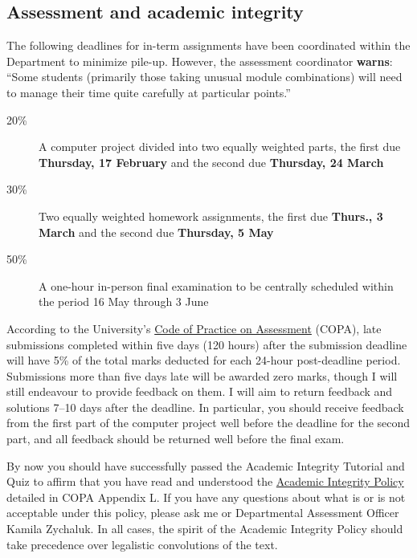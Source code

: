 \subsection*{Assessment and academic integrity}
The following deadlines for in-term assignments have been coordinated within the Department to minimize pile-up.
However, the assessment coordinator \textbf{warns}: ``Some students (primarily those taking unusual module combinations) will need to manage their time quite carefully at particular points.''
\begin{description}
  \item[20\%] A computer project divided into two equally weighted parts, the first due \textbf{Thursday, 17 February} and the second due \textbf{Thursday, 24 March}
  \item[30\%] Two equally weighted homework assignments, the first due \textbf{Thurs., 3 March} and the second due \textbf{Thursday, 5 May}
  \item[50\%] A one-hour in-person final examination to be centrally scheduled within the period 16 May through 3 June
\end{description}

According to the University's \href{https://www.liverpool.ac.uk/media/livacuk/tqsd/code-of-practice-on-assessment/code_of_practice_on_assessment.pdf}{Code of Practice on Assessment} (COPA), late submissions completed within five days (120 hours) after the submission deadline will have 5\% of the total marks deducted for each 24-hour post-deadline period.
Submissions more than five days late will be awarded zero marks, though I will still endeavour to provide feedback on them.
I will aim to return feedback and solutions 7--10 days after the deadline.
In particular, you should receive feedback from the first part of the computer project well before the deadline for the second part, and all feedback should be returned well before the final exam.

By now you should have successfully passed the Academic Integrity Tutorial and Quiz to affirm that you have read and understood the \href{https://www.liverpool.ac.uk/media/livacuk/tqsd/code-of-practice-on-assessment/appendix_L_cop_assess.pdf}{Academic Integrity Policy} detailed in COPA Appendix L.
If you have any questions about what is or is not acceptable under this policy, please ask me or Departmental Assessment Officer Kamila Zychaluk.
In all cases, the spirit of the Academic Integrity Policy should take precedence over legalistic convolutions of the text.

